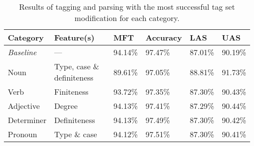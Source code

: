 \documentclass[11pt,a4paper]{article}
\begin{document}

\begin{table*}
    \centering
    \smaller[0.5]
    \begin{tabular}{@{}llllll@{}}
        \toprule
        \textbf{Category} & \textbf{Feature(s)} & \textbf{MFT} &
        \textbf{Accuracy} & \textbf{LAS} & \textbf{UAS} \\
        \midrule
        \emph{Baseline} & --- & 94.14\% & 97.47\% & 87.01\% & 90.19\% \\
        Noun & Type, case \& definiteness & 89.61\% & 97.05\% & 88.81\% &
        91.73\% \\
        Verb & Finiteness & 93.72\% & 97.35\% & 87.30\% & 90.43\% \\
        Adjective & Degree & 94.13\% & 97.41\% & 87.29\% & 90.44\% \\
        Determiner & Definiteness & 94.13\% & 97.49\% & 87.30\% & 90.42\% \\
        Pronoun & Type \& case & 94.12\% & 97.51\% & 87.30\% & 90.41\% \\
        \bottomrule
    \end{tabular}
    \caption{Results of tagging and parsing with the most successful tag set
        modification for each category.}
    \label{respectiveresults}
\end{table*}
\end{document}
